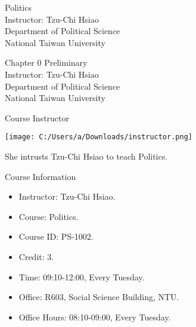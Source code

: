 \documentclass{beamer}
\title{}
\author{}
\date{}
\begin{document}
\begin{frame}
\begin{center}
\Large{Politics} \\
\vspace{3em}
\normalsize{Instructor: Tzu-Chi Hsiao} \\
\vspace{3em}
\small{Department of Political Science} \\
\vspace{1em}
\small{National Taiwan University}
\end{center}
\end{frame}
\begin{frame}
\begin{center}
\Large{Chapter 0 Preliminary} \\
\vspace{3em}
\normalsize{Instructor: Tzu-Chi Hsiao} \\
\vspace{3em}
\small{Department of Political Science} \\
\vspace{1em}
\small{National Taiwan University} \\
\end{center}
\end{frame}
\begin{frame}{Course Instructor}
\begin{center}
\texttt{[image: C:/Users/a/Downloads/instructor.png]}
\end{center}
\begin{center}
She intrusts Tzu-Chi Hsiao to teach Politics.
\end{center}
\end{frame}
\begin{frame}{Course Information}
\begin{itemize}
\pause
\item Instructor: Tzu-Chi Hsiao.
\pause
\item Course: Politics.
\pause
\item Course ID: PS-1002.
\pause
\item Credit: 3.
\pause
\item Time: 09:10-12:00, Every Tuesday.
\pause
\item Office: R603, Social Science Building, NTU.
\pause
\item Office Hours: 08:10-09:00, Every Tuesday.
\end{itemize}
\end{frame}
\end{document}
